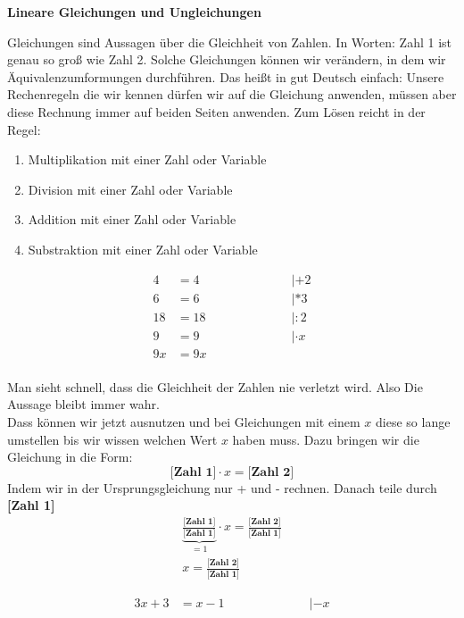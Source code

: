 \documentclass[a4paper,12pt]{article}
\newcommand{\Uebungsblatt}{ Lineare Gleichungen und Ungleichungen}
\newcommand{\Aufgabe}[2]{
	{
		\vspace*{0.3cm}
		\begin{tcolorbox}[breakable,colback=yellow!0,colframe=black!65!black,title=\textbf{Aufgabe #1:},width=\linewidth ]
			{#2}
		\end{tcolorbox}
		
		
	}
}
\newcommand{\Beispiel}[1]{
	\vspace*{0.3cm}
	\begin{tcolorbox}[breakable,colback=yellow!0,colframe=green!65!black,title=\textbf{Beispiel:},width=\linewidth ]
		{#1}
	\end{tcolorbox}
}
\newcommand{\Heuristik}[1]{
	\vspace*{0.3cm}
	\begin{tcolorbox}[breakable,colback=yellow!0,colframe=red!65!black,title=\textbf{Wie gehe ich vor?:},width=\linewidth ]
		{#1}
	\end{tcolorbox}
}
\begin{document}
	\thispagestyle{fancy}
	\begin{center}
		\LARGE \sf \textbf{ \Uebungsblatt{}}
	\end{center}

	
	\Aufgabe{1 (Gleichungen)}{
		\Heuristik{
			Gleichungen sind Aussagen über die Gleichheit von Zahlen. In Worten: Zahl 1 ist genau so groß wie Zahl 2.
			Solche Gleichungen können wir verändern, in dem wir Äquivalenzumformungen durchführen. 
			Das heißt in gut Deutsch einfach: Unsere Rechenregeln die wir kennen dürfen wir auf die Gleichung anwenden, müssen aber diese Rechnung immer auf beiden Seiten anwenden. Zum Lösen reicht in der Regel: 
			\begin{enumerate}[$\circ$]
				\item Multiplikation mit einer Zahl oder Variable
				\item Division mit einer Zahl oder Variable
				\item Addition mit einer Zahl oder Variable
				\item Substraktion mit einer Zahl oder Variable
			\end{enumerate}
			\Beispiel{
				\begin{align*}
					4&=4 \qquad\qquad\qquad &| +2\\
					6&=6 \qquad\qquad\qquad &| *3\\
					18&=18 \qquad\qquad\qquad &| :2\\
					9&=9 \qquad\qquad\qquad &| \cdot x\\
					9x&=9x \qquad\qquad\qquad \\
				\end{align*}}
			Man sieht schnell, dass die Gleichheit der Zahlen nie verletzt wird. Also Die Aussage bleibt immer wahr.\\
			Dass können wir jetzt ausnutzen und bei Gleichungen mit einem $x$ diese so lange umstellen bis wir wissen welchen Wert $x$ haben muss.
			Dazu bringen wir die Gleichung in die Form:\[ \textbf{[Zahl 1]}\cdot x = \textbf{[Zahl 2]}\]
			Indem wir in der Ursprungsgleichung nur + und - rechnen.
			Danach teile durch \textbf{[Zahl 1]}
			\begin{align*}
				\underbrace{\frac{\textbf{[Zahl 1]}}{\textbf{[Zahl 1]}}}_{=1}\cdot x = \frac{\textbf{[Zahl 2]}}{\textbf{[Zahl 1]}}\\
				x= \frac{\textbf{[Zahl 2]}}{\textbf{[Zahl 1]}}
			\end{align*}
		}
		\Beispiel{
				\begin{align*}
					3x+3 &= x-1\qquad\qquad\qquad &| -x\\

\end{align*}}}
\end{document}
